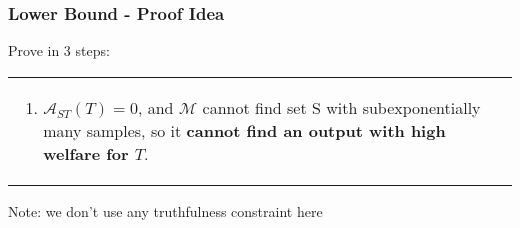 \documentclass[hyperref={pdfpagelabels=false}]{beamer}
\newenvironment{proofid}{%
  \renewcommand{\proofname}{Proof Idea}\proof}{\endproof}
\newcommand\Algo{\mathcal{A}}
\newcommand\Mech{\mathcal{M}}
\begin{document}
\begin{frame}
	\frametitle{Lower Bound - Proof Idea}
  \welfUB*
	
  \begin{proofid}\renewcommand{\qedsymbol}{}
		Prove in 3 steps:
		\begin{tabular}{m{5cm} m{6cm}}
			\begin{enumerate}
				\item $\Algo_{ST}(T) = 0$, and $\Mech$ cannot find set S with
						subexponentially many samples, so it \textbf{cannot find an
						output with high welfare for $T$}.

			\end{enumerate}
		& 
			\begin{center}
				\begin{minipage}{.3\textwidth}
				 	\resizebox{4cm}{3cm}{
						
					}
				\end{minipage}
			\end{center}
		\end{tabular}
	\end{proofid}
	Note: we don't use any truthfulness constraint here
\end{frame}
\end{document}
